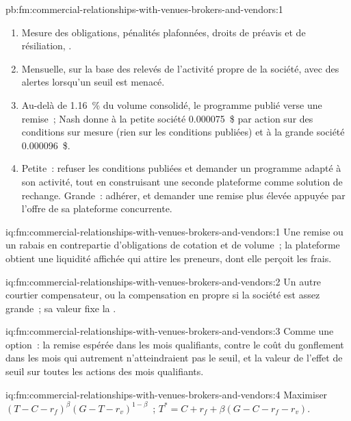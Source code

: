 \begin{solution}{pb:fm:commercial-relationships-with-venues-brokers-and-vendors:1}
\begin{enumerate}
\item Mesure des obligations, pénalités plafonnées, droits de préavis et de résiliation, .
\item Mensuelle, sur la base des relevés de l'activité propre de la société, avec des alertes lorsqu'un seuil est menacé.
\item Au-delà de 1.16~\% du volume consolidé, le programme publié verse une remise~; Nash donne à la petite société 0.000075~\$ par action sur des conditions sur mesure (rien sur les conditions publiées) et
à la grande société 0.000096~\$.
\item Petite~: refuser les conditions publiées et demander un programme adapté à son activité, tout en construisant une seconde plateforme comme solution de rechange. Grande~:
adhérer, et demander une remise plus élevée appuyée par l'offre de sa plateforme concurrente.
\end{enumerate}
\end{solution}

\begin{solution}{iq:fm:commercial-relationships-with-venues-brokers-and-vendors:1}
Une remise ou un rabais en contrepartie d'obligations de cotation et de volume~; la plateforme obtient une liquidité affichée qui attire les preneurs, dont elle perçoit les frais.
\end{solution}

\begin{solution}{iq:fm:commercial-relationships-with-venues-brokers-and-vendors:2}
Un autre courtier compensateur, ou la compensation en propre si la société est assez grande~; sa valeur fixe la .
\end{solution}

\begin{solution}{iq:fm:commercial-relationships-with-venues-brokers-and-vendors:3}
Comme une option~: la remise espérée dans les mois qualifiants, contre le coût du gonflement dans les mois qui autrement n'atteindraient pas le seuil, et la valeur de l'effet de seuil sur
toutes les actions des mois qualifiants.
\end{solution}

\begin{solution}{iq:fm:commercial-relationships-with-venues-brokers-and-vendors:4}
Maximiser $(T-C-r_f)^\beta(G-T-r_v)^{1-\beta}$~; $T^*=C+r_f+\beta(G-C-r_f-r_v)$.
\end{solution}

